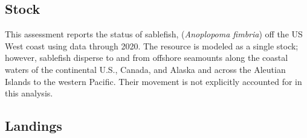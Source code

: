 \documentclass[11pt,
  english,
  a4paper,
]{article}
\begin{document}
\leavevmode\tagmcend\tagstructend


\hypertarget{stock}{%
\subsection*{Stock}\label{stock}}

\leavevmode\tagmcend\tagstructend


This assessment reports the status of sablefish, (\emph{Anoplopoma fimbria}) off the US West coast using data through 2020. The resource is modeled as a single stock; however, sablefish disperse to and from offshore seamounts along the coastal waters of the continental U.S., Canada, and Alaska and across the Aleutian Islands to the western Pacific. Their movement is not explicitly accounted for in this analysis.

\leavevmode\tagmcend\tagstructend\par


\hypertarget{landings}{%
\subsection*{Landings}\label{landings}}

\leavevmode\tagmcend\tagstructend

\end{document}
